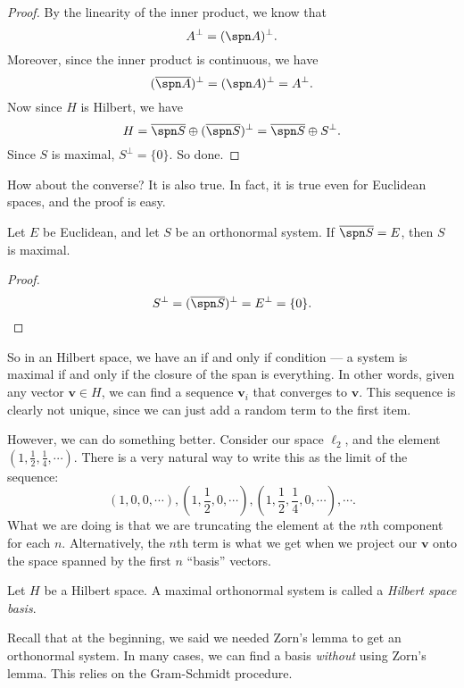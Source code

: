 \documentclass[a4paper]{article}
\begin{document}
\begin{proof}
  By the linearity of the inner product, we know that
  \[
    A^\perp = (\spn A)^\perp.
  \]
  Moreover, since the inner product is continuous, we have
  \[
    (\overline{\spn A})^\perp = (\spn A)^\perp = A^\perp.
  \]
  Now since $H$ is Hilbert, we have
  \[
    H = \overline{\spn S} \oplus (\overline{\spn S})^\perp = \overline{\spn S} \oplus S^\perp.
  \]
  Since $S$ is maximal, $S^\perp = \{0\}$. So done.
\end{proof}

How about the converse? It is also true. In fact, it is true even for Euclidean spaces, and the proof is easy.

\begin{prop}
  Let $E$ be Euclidean, and let $S$ be an orthonormal system. If $\overline{\spn S} = E$, then $S$ is maximal.
\end{prop}

\begin{proof}
  \[
    S^\perp = (\overline{\spn S})^\perp = E^\perp = \{0\}.
  \]
\end{proof}
So in an Hilbert space, we have an if and only if condition --- a system is maximal if and only if the closure of the span is everything. In other words, given any vector $\mathbf{v} \in H$, we can find a sequence $\mathbf{v}_i$ that converges to $\mathbf{v}$. This sequence is clearly not unique, since we can just add a random term to the first item.

However, we can do something better. Consider our space $\ell_2$, and the element $(1, \frac{1}{2}, \frac{1}{4}, \cdots)$. There is a very natural way to write this as the limit of the sequence:
\[
  (1, 0, 0, \cdots), (1, \frac{1}{2}, 0, \cdots), (1, \frac{1}{2}, \frac{1}{4}, 0, \cdots), \cdots.
\]
What we are doing is that we are truncating the element at the $n$th component for each $n$. Alternatively, the $n$th term is what we get when we project our $\mathbf{v}$ onto the space spanned by the first $n$ ``basis'' vectors.

\begin{defi}
  Let $H$ be a Hilbert space. A maximal orthonormal system is called a \emph{Hilbert space basis}.
\end{defi}

Recall that at the beginning, we said we needed Zorn's lemma to get an orthonormal system. In many cases, we can find a basis \emph{without} using Zorn's lemma. This relies on the Gram-Schmidt procedure.
\end{document}
